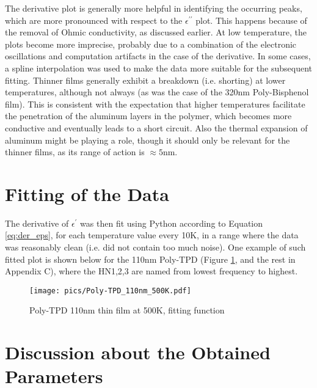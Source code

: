 The derivative plot is generally  more helpful in identifying the occurring peaks, which are more pronounced with respect to the $\epsilon^{\prime\prime}$ plot. This happens because of the removal of Ohmic conductivity, as discussed earlier. %
At low temperature, the plots become more imprecise, probably due to a combination of the electronic oscillations and computation artifacts in the case of the derivative. In some cases, a spline interpolation was used to make the data more suitable for the subsequent fitting.
Thinner films generally exhibit a breakdown (i.e. shorting) at lower temperatures, although not always (as was the case of the 320nm Poly-Bisphenol film). This is consistent with the expectation that higher temperatures facilitate the penetration of the aluminum layers in the polymer, which becomes more conductive and eventually leads to a short circuit. Also the thermal expansion of aluminum might be playing a role, though it should only be relevant for the thinner films, as its range of action is $\approx 5 \text{nm}$.














\section{Fitting of the Data}
The derivative of $\epsilon^{\prime}$ was then fit using Python according to Equation \ref{eq:der_eps}, for each temperature value every 10K, in a range where the data was reasonably clean (i.e. did not contain too much noise).
One example of such fitted plot is shown below for the 110nm Poly-TPD (Figure \ref{tpd110}, and the rest in Appendix C), where the HN1,2,3 are named from lowest frequency to highest.

\begin{figure}[!htb]
	\centering
  \texttt{[image: pics/Poly-TPD\_110nm\_500K.pdf]}
  \caption{Poly-TPD 110nm thin film at 500K, fitting function}
  \label{tpd110}
\end{figure}







\section{Discussion about the Obtained Parameters}
